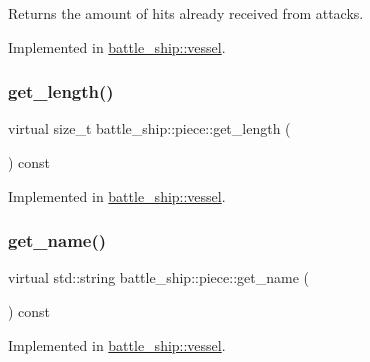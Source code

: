 Returns the amount of hits already received from attacks. 



Implemented in \hyperlink{classbattle__ship_1_1vessel_a549dc0f3fc45f3b3f7fa247316900a9a}{battle\+\_\+ship\+::vessel}.

\mbox{\label{classbattle__ship_1_1piece_a0188cda34ef90374396c52595761ef08}} 
\subsubsection{\texorpdfstring{get\+\_\+length()}{get\_length()}}
{\footnotesize\ttfamily virtual size\+\_\+t battle\+\_\+ship\+::piece\+::get\+\_\+length (\begin{DoxyParamCaption}{ }\end{DoxyParamCaption}) const\hspace{0.3cm}{\ttfamily [pure virtual]}}



Implemented in \hyperlink{classbattle__ship_1_1vessel_ae166b521339b6a7b8c0be1a9d7861131}{battle\+\_\+ship\+::vessel}.

\mbox{\label{classbattle__ship_1_1piece_a95531d660360ffc403a742db1b4f6413}} 
\subsubsection{\texorpdfstring{get\+\_\+name()}{get\_name()}}
{\footnotesize\ttfamily virtual std\+::string battle\+\_\+ship\+::piece\+::get\+\_\+name (\begin{DoxyParamCaption}{ }\end{DoxyParamCaption}) const\hspace{0.3cm}{\ttfamily [pure virtual]}}



Implemented in \hyperlink{classbattle__ship_1_1vessel_a623a1b35355db117b5381a3a0f5774eb}{battle\+\_\+ship\+::vessel}.

\mbox{\label{classbattle__ship_1_1piece_a2cc01b1ec66bfb91df048401233e9618}} 
